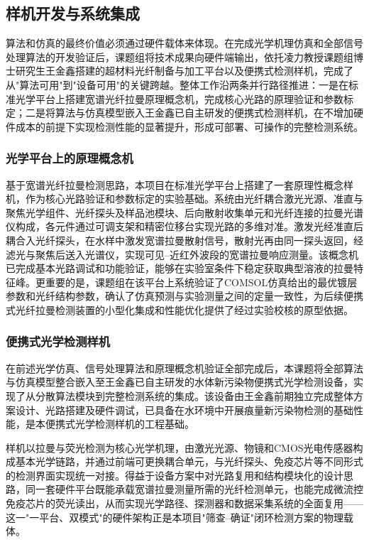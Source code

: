 \documentclass[12pt,a4paper]{article}
\begin{document}
\subsection{样机开发与系统集成}

算法和仿真的最终价值必须通过硬件载体来体现。在完成光学机理仿真和全部信号处理算法的开发验证后，课题组将技术成果向硬件端输出，依托凌力教授课题组博士研究生王金鑫搭建的超材料光纤制备与加工平台以及便携式检测样机，完成了从"算法可用"到"设备可用"的关键跨越。整体工作沿两条并行路径推进：一是在标准光学平台上搭建宽谱光纤拉曼原理概念机，完成核心光路的原理验证和参数标定；二是将算法与仿真模型嵌入王金鑫已自主研发的便携式检测样机，在不增加硬件成本的前提下实现检测性能的显著提升，形成可部署、可操作的完整检测系统。

\subsubsection{光学平台上的原理概念机}

基于宽谱光纤拉曼检测思路，本项目在标准光学平台上搭建了一套原理性概念样机，作为核心光路验证和参数标定的实验基础。系统由光纤耦合激光光源、准直与聚焦光学组件、光纤探头及样品池模块、后向散射收集单元和光纤连接的拉曼光谱仪构成，各元件通过可调支架和精密位移台实现光路的多维对准。激发光经准直后耦合入光纤探头，在水样中激发宽谱拉曼散射信号，散射光再由同一探头返回，经滤光与聚焦后送入光谱仪，实现可见--近红外波段的宽谱拉曼响应测量。该概念机已完成基本光路调试和功能验证，能够在实验室条件下稳定获取典型溶液的拉曼特征峰。更重要的是，课题组在该平台上系统验证了COMSOL仿真给出的最优镀层参数和光纤结构参数，确认了仿真预测与实验测量之间的定量一致性，为后续便携式光纤拉曼检测装置的小型化集成和性能优化提供了经过实验校核的原型依据。

\subsubsection{便携式光学检测样机}

在前述光学仿真、信号处理算法和原理概念机验证全部完成后，本课题将全部算法与仿真模型整合嵌入至王金鑫已自主研发的水体新污染物便携式光学检测设备，实现了从分散算法模块到完整检测系统的集成。该设备由王金鑫前期独立完成整体方案设计、光路搭建及硬件调试，已具备在水环境中开展痕量新污染物检测的基础性能，是本便携式光学检测样机的工程基础。

样机以拉曼与荧光检测为核心光学机理，由激光光源、物镜和CMOS光电传感器构成基本光学链路，并通过前端可更换耦合单元，与光纤探头、免疫芯片等不同形式的检测界面实现统一对接。得益于设备方案中对光路复用和结构模块化的设计思路，同一套硬件平台既能承载宽谱拉曼测量所需的光纤检测单元，也能完成微流控免疫芯片的荧光读出，从而实现光学路径、探测器和数据采集系统的全面复用——这一"一平台、双模式"的硬件架构正是本项目"筛查--确证"闭环检测方案的物理载体。
\end{document}
